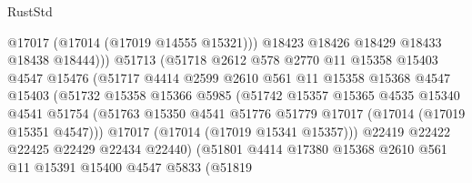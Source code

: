\begin{lexlean}{RustStd}
\begin{coremodule}
{\begin{coremodule}
{{{{{{{{{{{{{{{{{{{{{{{{{{{{{{{{{{{{{{{{{{{{{{{{{{{{{{{                                  @17017
                                  (@17014 (@17019 @14555 @15321)))
                                @18423
                                @18426
                                @18429
                                @18433
                                @18438
                                @18444)))
                          @51713
                          (@51718
                            @2612
                            @578
                            @2770
                            @11
                            @15358
                            @15403
                            @4547
                            @15476
                            (@51717
                              @4414
                              @2599
                              @2610
                              @561
                              @11
                              @15358
                              @15368
                              @4547
                              @15403
                              (@51732
                                @15358
                                @15366
                                @5985
                                (@51742
                                  @15357
                                  @15365
                                  @4535
                                  @15340
                                  @4541
                                  @51754
                                  (@51763
                                    @15350
                                    @4541
                                    @51776
                                    @51779
                                    @17017
                                    (@17014 (@17019 @15351 @4547)))
                                  @17017
                                  (@17014 (@17019 @15341 @15357)))
                                @22419
                                @22422
                                @22425
                                @22429
                                @22434
                                @22440)
                              (@51801
                                @4414
                                @17380
                                @15368
                                @2610
                                @561
                                @11
                                @15391
                                @15400
                                @4547
                                @5833
                                (@51819
}}}}}}}}}}}}}}}}}}}}}}}}}}}}}}}}}}}}}}}}}}}}}}}}}}}}}}}
\end{coremodule}}
\end{coremodule}
\end{lexlean}

